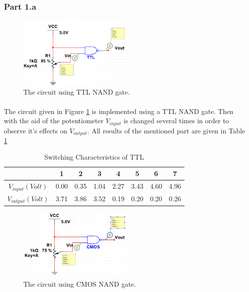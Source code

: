 \documentclass[pdftex,12pt,a4paper]{article}
\begin{document}
\begin{flushleft}
\subsubsection{Part 1.a}

 \begin{figure}[h]
    	\centering
    	\includegraphics[width=0.5\textwidth]{part1a-ttl.png}	
    	\caption{The circuit using TTL NAND gate.}
    	\label{fig:1-part1a-ttl}
\end{figure}

\paragraph{} %
The circuit given in Figure \ref{fig:1-part1a-ttl} is implemented using a TTL NAND gate. Then with the aid of the potentiometer $V_{input}$ is changed several times in order to observe it's effects on $V_{output}$. All results of the mentioned part are given in Table \ref{part1a-TTL}


\begin{table}[h]

\begin{tabular}{c|c|c|c|c|c|c|c|}
                   & 1    & 2    & 3    & 4    & 5    & 6    & 7    \\ \hline
$V_{input} (Volt)$ & 0.00 & 0.35 & 1.04 & 2.27 & 3.43 & 4.60 & 4.96 \\ \hline
$V_{output}(Volt)$       & 3.71 & 3.86 & 3.52 & 0.19 & 0.20 & 0.20 & 0.26
\end{tabular}
\centering
\caption{Switching Characteristics of TTL}
\label{part1a-TTL}
\end{table}

 \begin{figure}[h]
    	\centering
    	\includegraphics[width=0.5\textwidth]{part1a-cmos.png}	
    	\caption{The circuit using CMOS NAND gate.}
    	\label{fig:2-part1a-cmos}
\end{figure}


\end{flushleft}
\end{document}
